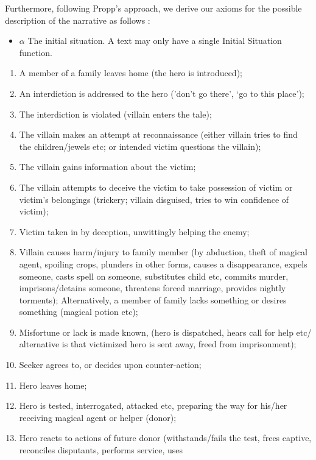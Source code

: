 \documentclass[10pt,a4paper]{article}
\begin{document}
Furthermore, following Propp's approach, we derive our axioms for the possible description of the narrative as follows \cite{propp1968}: 
\begin{itemize}
	\item 	 $\alpha$ The initial situation. A text may only have a single Initial Situation function. 

\end{itemize}
\begin{enumerate}

	\item  A member of a family leaves home (the hero is introduced);
 	\item  An interdiction is addressed to the hero (’don’t go there’, ‘go to
this place’);
	\item  The interdiction is violated (villain enters the tale);
	\item  The villain makes an attempt at reconnaissance (either villain
tries to find the children/jewels etc; or intended victim questions
the villain);
 	\item  The villain gains information about the victim;
 	\item  The villain attempts to deceive the victim to take possession of
victim or victim’s belongings (trickery; villain disguised, tries to win
confidence of victim);
 	\item  Victim taken in by deception, unwittingly helping the enemy;
 	\item  Villain causes harm/injury to family member (by abduction,
theft of magical agent, spoiling crops, plunders in other forms,
causes a disappearance, expels someone, casts spell on someone,
substitutes child etc, commits murder, imprisons/detains someone,
threatens forced marriage, provides nightly torments); Alternatively,
a member of family lacks something or desires something (magical
potion etc);
 	\item  Misfortune or lack is made known, (hero is dispatched, hears
call for help etc/ alternative is that victimized hero is sent away,
freed from imprisonment);
 	\item  Seeker agrees to, or decides upon counter-action;
	\item  Hero leaves home;
 	\item  Hero is tested, interrogated, attacked etc, preparing the way
for his/her receiving magical agent or helper (donor);
 	\item  Hero reacts to actions of future donor (withstands/fails the
test, frees captive, reconciles disputants, performs service, uses

\end{enumerate}
\end{document}

